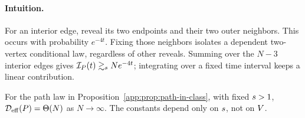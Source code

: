 \paragraph{Intuition.}
For an interior edge, reveal its two endpoints and their two outer
neighbors. This occurs with probability $e^{-4t}$.
Fixing those neighbors isolates a dependent two-vertex conditional law,
regardless of other reveals. Summing over the $N-3$ interior edges gives
$\mathcal I_P(t)\gtrsim_{s}Ne^{-4t}$;
integrating over a fixed time interval keeps a linear contribution.

\begin{corollary}
\label{app:cor:path-effective-tc}
For the path law in Proposition~\ref{app:prop:path-in-class},
with fixed $s>1$,
$\mathcal D_{\mathrm{eff}}(P)=\Theta(N)$ as $N\to\infty$.
The constants depend only on $s$, not on $V$.
\end{corollary}


